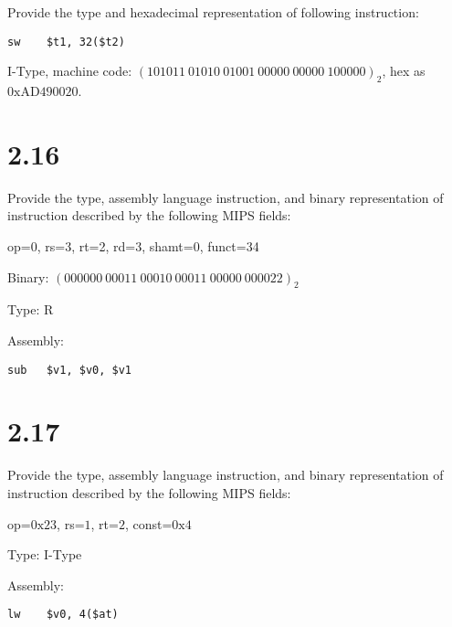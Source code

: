 \documentclass[paper=a4, fontsize=11pt]{scrartcl} %
\begin{document}
\begin{fancyquotes}
  Provide the type and hexadecimal representation of following instruction:
\end{fancyquotes}

\begin{lstlisting}[language={[mips]Assembler}]
  sw	$t1, 32($t2)
\end{lstlisting}


I-Type, machine code: ${(101011\ 01010\ 01001\ 00000\ 00000\ 100000)}_2$,
hex as $\mathrm{0xAD490020}$.


\section{2.16}

\begin{fancyquotes}
  Provide the type, assembly language instruction, and binary
  representation of instruction described by the following MIPS
  fields:

  op=0, rs=3, rt=2, rd=3, shamt=0, funct=34
\end{fancyquotes}

Binary: ${(000000\ 00011\ 00010\ 00011\ 00000\ 000022)}_2$

Type: R

Assembly:
\begin{lstlisting}[language={[mips]Assembler}]
  sub	$v1, $v0, $v1
\end{lstlisting}                %


\section{2.17}

\begin{fancyquotes}
  Provide the type, assembly language instruction, and binary
  representation of instruction described by the following MIPS
  fields:
\end{fancyquotes}

op=$\mathrm{0x23}$, rs=$1$, rt=$2$, const=$\mathrm{0x4}$

Type: I-Type

Assembly:
\begin{lstlisting}[language={[mips]Assembler}]
  lw	$v0, 4($at)
\end{lstlisting}                %
\end{document}
